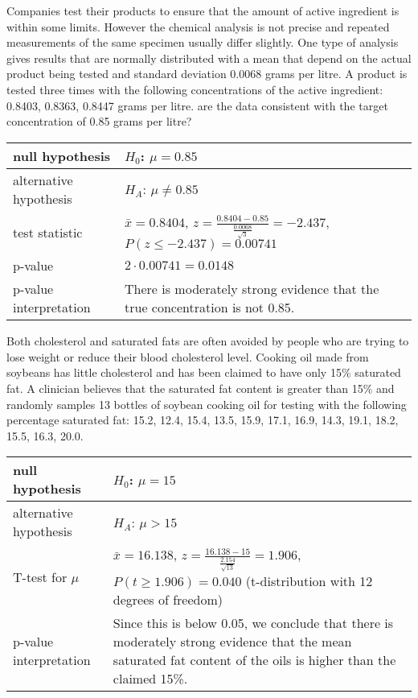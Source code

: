 \begin{example}
    Companies test their products to ensure that the amount of active ingredient is within some limits. However the chemical analysis is not precise and repeated measurements of the same specimen usually differ slightly. One type of analysis gives results that are normally distributed with a mean that depend on the actual product being tested and standard deviation 0.0068 grams per litre. A product is tested three times with the following concentrations of the active ingredient: 0.8403, 0.8363, 0.8447 grams per litre. are the data consistent with the target concentration of 0.85 grams per litre?
    \begin{center}
       \begin{tabular}{p{4cm}|p{7cm}}
            null hypothesis & $H_0$: $\mu=0.85$ \\
            \hline
            alternative hypothesis & $H_A$: $\mu\neq 0.85$ \\
            \hline
            test statistic & $\bar{x} = 0.8404$, $z=\frac{0.8404-0.85}{\frac{0.0068}{\sqrt{3}}} = -2.437$, $P(z\le -2.437) = 0.00741$ \\
            \hline
            p-value & $2\cdot 0.00741 = 0.0148$ \\
            \hline
            p-value interpretation & There is moderately strong evidence that the true concentration is not 0.85.
       \end{tabular}
    \end{center}
\end{example}

\begin{example}
    Both cholesterol and saturated fats are often avoided by people who are trying to lose weight or reduce their blood cholesterol level. Cooking oil made from soybeans has little cholesterol and has been claimed to have only 15\% saturated fat. A clinician believes that the saturated fat content is greater than 15\% and randomly samples 13 bottles of soybean cooking oil for testing with the following percentage saturated fat: 15.2, 12.4, 15.4, 13.5, 15.9, 17.1, 16.9, 14.3, 19.1, 18.2, 15.5, 16.3, 20.0.
    \begin{center}
       \begin{tabular}{p{4cm}|p{7cm}}
            null hypothesis & $H_0$: $\mu=15$ \\
            \hline
            alternative hypothesis & $H_A$: $\mu > 15$ \\
            \hline
            T-test for $\mu$ & $\bar{x} = 16.138$, $z=\frac{16.138-15}{\frac{2.154}{\sqrt{13}}} = 1.906$, $P(t\ge 1.906) = 0.040$ (t-distribution with 12 degrees of freedom) \\
            \hline
            p-value interpretation & Since this is below 0.05, we conclude that there is moderately strong evidence that the mean saturated fat content of the oils is higher than the claimed 15\%.
       \end{tabular}
    \end{center}
\end{example}

